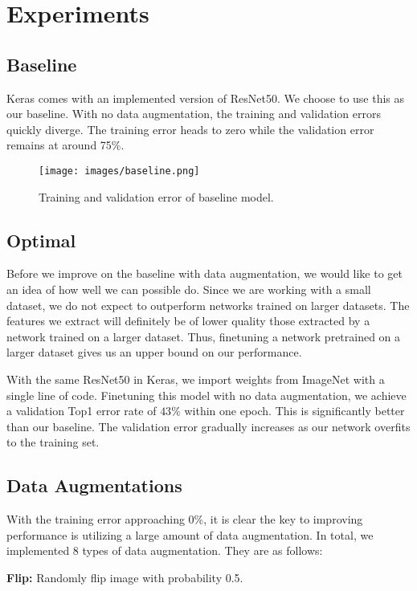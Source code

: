 \documentclass[10pt,twocolumn,letterpaper]{article}
\begin{document}
\section{Experiments}
\subsection{Baseline}
Keras comes with an implemented version of ResNet50. We choose to use this as our baseline. With no data augmentation, the training and validation errors quickly diverge. The training error heads to zero while the validation error remains at around 75\%.
\begin{figure}[h]
\begin{center}
\texttt{[image: images/baseline.png]}
\end{center}
   \caption{Training and validation error of baseline model.}
\label{fig:baseline}
\end{figure}

\subsection{Optimal}
Before we improve on the baseline with data augmentation, we would like to get an idea of how well we can possible do. Since we are working with a small dataset, we do not expect to outperform networks trained on larger datasets. The features we extract will definitely be of lower quality those extracted by a network trained on a larger dataset. Thus, finetuning a network pretrained on a larger dataset gives us an upper bound on our performance.

With the same ResNet50 in Keras, we import weights from ImageNet with a single line of code. Finetuning this model with no data augmentation, we achieve a validation Top1 error rate of $43\%$ within one epoch. This is significantly better than our baseline. The validation error gradually increases as our network overfits to the training set. 

\subsection{Data Augmentations}
With the training error approaching 0\%, it is clear the key to improving performance is utilizing a large amount of data augmentation. In total, we implemented 8 types of data augmentation. They are as follows:

\textbf{Flip:} Randomly flip image with probability 0.5.
\end{document}

